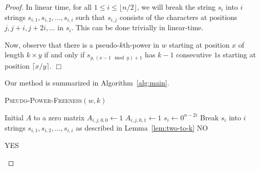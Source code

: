 \documentclass[12pt]{article}
\begin{document}
\begin{proof}
      In linear time, for all $1\leq i\leq \lfloor n/2\rfloor$, we will break the string $s_i$ into $i$ strings $s_{i,1}, s_{i, 2}, \ldots,
      s_{i, i}$ such that $s_{i,j}$ consists of the characters at positions $j, j+i, j+2i, \ldots$ in
      $s_i$.
This can be done trivially in linear-time.

      Now, observe that there is a pseudo-$k$th-power in $w$ starting at position $x$ of length
      $k\times y$ if and
      only if $s_{y, (x - 1 \mod y) + 1}$ has $k-1$ consecutive $1$s starting at position
      $\lceil x/y\rceil$.
    \hfill$\Box$

    Our method is summarized in Algorithm~\ref{alg:main}.

    \begin{algorithm}
      \label{alg:main}
      \caption{\textsc{Pseudo-Power-Freeness}$(w,k)$}
      Initial $A$ to a zero matrix\;
       {
         {$A_{i,j,0,0} \leftarrow 1$}\;
         {$A_{i,j,0,1} \leftarrow 1$}\;
      }
      \SetVline
      \nl{}
      \SetVline
      \nl{} {
        \SetNoline
        $s_i \leftarrow 0^{n-2i}$\;
      }
      \SetVline
      \nl{} {
        \SetNoline
        Break $s_i$ into $i$ strings $s_{i,1}, s_{i,2}, \ldots, s_{i,i}$ as described in
        Lemma~\ref{lem:two-to-k}\;
        {\Return NO\;}
      }

      \Return YES\;
    \end{algorithm}


\end{proof}
\end{document}
